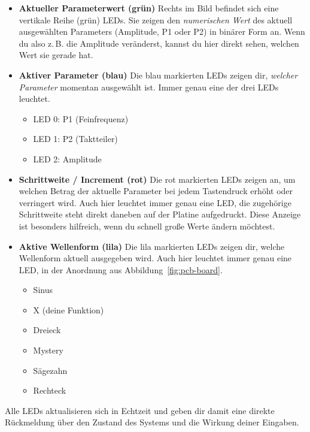 \begin{itemize}
    \item \textbf{Aktueller Parameterwert (grün)}  
    Rechts im Bild befindet sich eine vertikale Reihe (grün) LEDs.  
    Sie zeigen den \emph{numerischen Wert} des aktuell ausgewählten Parameters
    (Amplitude, P1 oder P2) in binärer Form an.  
    Wenn du also z.\,B. die Amplitude veränderst, kannst du hier direkt sehen,
    welchen Wert sie gerade hat.

    \item \textbf{Aktiver Parameter (blau)}  
    Die blau markierten LEDs zeigen dir, \emph{welcher Parameter} momentan
    ausgewählt ist. Immer genau eine der drei LEDs leuchtet.
    \begin{itemize}
        \item LED 0: P1 (Feinfrequenz)
        \item LED 1: P2 (Taktteiler)
        \item LED 2: Amplitude
    \end{itemize}

    \item \textbf{Schrittweite / Increment (rot)}
    Die rot markierten LEDs zeigen an, um welchen Betrag der aktuelle Parameter
    bei jedem Tastendruck erhöht oder verringert wird. Auch hier leuchtet immer
    genau eine LED, die zugehörige Schrittweite steht direkt daneben auf der
    Platine aufgedruckt.
    Diese Anzeige ist besonders hilfreich, wenn du schnell große Werte ändern
    möchtest.

    \item \textbf{Aktive Wellenform (lila)}  
    Die lila markierten LEDs zeigen dir, welche Wellenform aktuell ausgegeben
    wird. Auch hier leuchtet immer genau eine LED, in der Anordnung aus
    Abbildung~\ref{fig:pcb-board}.
    \begin{itemize}
        \item Sinus
        \item X (deine Funktion)
        \item Dreieck
        \item Mystery
        \item Sägezahn
        \item Rechteck
    \end{itemize}
\end{itemize}

Alle LEDs aktualisieren sich in Echtzeit und geben dir damit eine direkte
Rückmeldung über den Zustand des Systems und die Wirkung deiner Eingaben.



